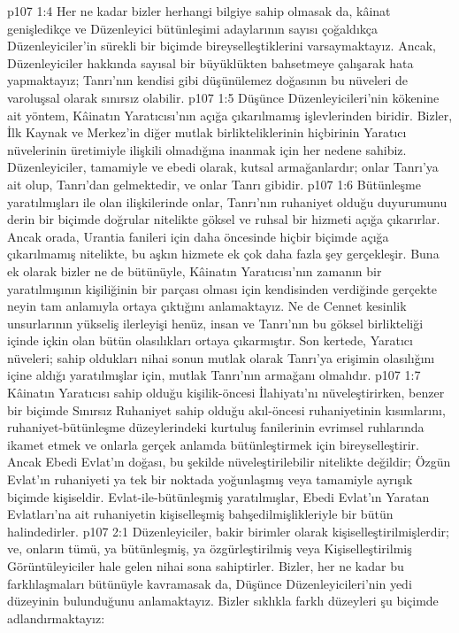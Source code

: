\vs p107 1:4 Her ne kadar bizler herhangi bilgiye sahip olmasak da, kâinat genişledikçe ve Düzenleyici bütünleşimi adaylarının sayısı çoğaldıkça Düzenleyiciler’in sürekli bir biçimde bireyselleştiklerini varsaymaktayız. Ancak, Düzenleyiciler hakkında sayısal bir büyüklükten bahsetmeye çalışarak hata yapmaktayız; Tanrı’nın kendisi gibi düşünülemez doğasının bu nüveleri de varoluşsal olarak sınırsız olabilir.
\vs p107 1:5 Düşünce Düzenleyicileri’nin kökenine ait yöntem, Kâinatın Yaratıcısı’nın açığa çıkarılmamış işlevlerinden biridir. Bizler, İlk Kaynak ve Merkez’in diğer mutlak birlikteliklerinin hiçbirinin Yaratıcı nüvelerinin üretimiyle ilişkili olmadığına inanmak için her nedene sahibiz. Düzenleyiciler, tamamiyle ve ebedi olarak, kutsal armağanlardır; onlar Tanrı’ya ait olup, Tanrı’dan gelmektedir, ve onlar Tanrı gibidir.
\vs p107 1:6 Bütünleşme yaratılmışları ile olan ilişkilerinde onlar, Tanrı’nın ruhaniyet olduğu duyurumunu derin bir biçimde doğrular nitelikte göksel ve ruhsal bir hizmeti açığa çıkarırlar. Ancak orada, Urantia fanileri için daha öncesinde hiçbir biçimde açığa çıkarılmamış nitelikte, bu aşkın hizmete ek çok daha fazla şey gerçekleşir. Buna ek olarak bizler ne de bütünüyle, Kâinatın Yaratıcısı’nın zamanın bir yaratılmışının kişiliğinin bir parçası olması için kendisinden verdiğinde gerçekte neyin tam anlamıyla ortaya çıktığını anlamaktayız. Ne de Cennet kesinlik unsurlarının yükseliş ilerleyişi henüz, insan ve Tanrı’nın bu göksel birlikteliği içinde içkin olan bütün olasılıkları ortaya çıkarmıştır. Son kertede, Yaratıcı nüveleri; sahip oldukları nihai sonun mutlak olarak Tanrı’ya erişimin olasılığını içine aldığı yaratılmışlar için, mutlak Tanrı’nın armağanı olmalıdır.
\vs p107 1:7 Kâinatın Yaratıcısı sahip olduğu kişilik\hyp{}öncesi İlahiyatı’nı nüveleştirirken, benzer bir biçimde Sınırsız Ruhaniyet sahip olduğu akıl\hyp{}öncesi ruhaniyetinin kısımlarını, ruhaniyet\hyp{}bütünleşme düzeylerindeki kurtuluş fanilerinin evrimsel ruhlarında ikamet etmek ve onlarla gerçek anlamda bütünleştirmek için bireyselleştirir. Ancak Ebedi Evlat’ın doğası, bu şekilde nüveleştirilebilir nitelikte değildir; Özgün Evlat’ın ruhaniyeti ya tek bir noktada yoğunlaşmış veya tamamiyle ayrışık biçimde kişiseldir. Evlat\hyp{}ile\hyp{}bütünleşmiş yaratılmışlar, Ebedi Evlat’ın Yaratan Evlatları’na ait ruhaniyetin kişiselleşmiş bahşedilmişlikleriyle bir bütün halindedirler.
\vs p107 2:1 Düzenleyiciler, bakir birimler olarak kişiselleştirilmişlerdir; ve, onların tümü, ya bütünleşmiş, ya özgürleştirilmiş veya Kişiselleştirilmiş Görüntüleyiciler hale gelen nihai sona sahiptirler. Bizler, her ne kadar bu farklılaşmaları bütünüyle kavramasak da, Düşünce Düzenleyicileri’nin yedi düzeyinin bulunduğunu anlamaktayız. Bizler sıklıkla farklı düzeyleri şu biçimde adlandırmaktayız:
